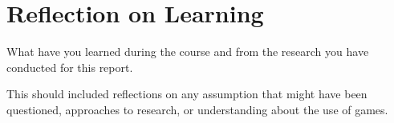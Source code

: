 \section{Reflection on Learning}
What have you learned during the course and from the research you have conducted for this report.

This should included reflections on any assumption that might have been questioned, approaches to research, or understanding about the use of games.